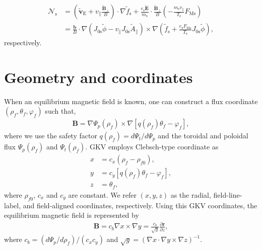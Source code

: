 \begin{align}
  \mathcal{N}_\mathrm{s} &= \left( \tilde{\bm{v}}_\mathrm{E} + v_\parallel \frac{\tilde{\bm{B}}_\perp}{B} \right) \cdot \nabla \tilde{f}_\mathrm{s} + \frac{e_\mathrm{s} \tilde{\bm{E}}}{m_\mathrm{s}} \cdot \frac{\tilde{\bm{B}}_\perp}{B} \left(- \frac{m_\mathrm{s} v_\parallel}{T_\mathrm{s}} F_\mathrm{Ms} \right) \nonumber \\
  &= \frac{\bm{b}}{B} \cdot \nabla \left( J_{0\mathrm{s}} \tilde{\phi} - v_\parallel J_{0\mathrm{s}} \tilde{A}_\parallel \right) \times \nabla \left( \tilde{f}_\mathrm{s} + \frac{e_\mathrm{s} F_\mathrm{Ms}}{T_\mathrm{s}} J_{0\mathrm{s}} \tilde{\phi} \right), 
\end{align}
respectively.



\section{Geometry and coordinates} 
\label{sec:Geometry and coordinates}

When an equilibrium magnetic field is known, one can construct a flux coordinate $(\rho_f, \theta_f, \varphi_f)$ such that,
\begin{align}
  \bm{B} = \nabla \Psi_p(\rho_f) \times \nabla [q(\rho_f)\theta_f - \varphi_f],
\end{align}
where we use the safety factor $q(\rho_f) = d\Psi_t/d\Psi_p$ and the toroidal and poloidal flux $\Psi_p(\rho_f)$ and $\Psi_t(\rho_f)$. GKV employs Clebsch-type coordinate as
\begin{align}
  x &= c_x (\rho_f - \rho_{f0}), \\
  y &= c_y [q(\rho_f) \theta_f - \varphi_f], \\
  z &= \theta_f,
\end{align}
where $\rho_{f0}$, $c_x$ and $c_y$ are constant. We refer $(x, y, z)$ as the radial, field-line-label, and field-aligned coordinates, respectively. Using this GKV coordinates, the equilibrium magnetic field is represented by 
\begin{align}
  \bm{B} = c_b \nabla x \times \nabla y = \frac{c_b}{\sqrt{g}} \frac{\partial \bm{r}}{\partial z},
\end{align}
where $c_b = (d\Psi_p/d\rho_f)/(c_x c_y)$ and $\sqrt{g} = (\nabla x \cdot \nabla y \times \nabla z)^{-1}$. 

